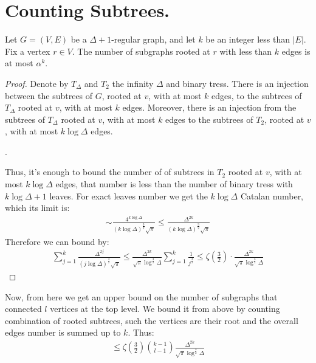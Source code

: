 
   \section{Counting Subtrees.} 

  \begin{claim}
    \label{claim:counting_trees}
    Let $G = \left( V, E \right)$ be a $\Delta + 1$-regular graph, and let $k$ be an integer less than $|E|$. Fix a vertex $r \in V$. The number of subgraphs rooted at $r$ with less than $k$ edges is at most $\alpha^{k}$.
  \end{claim}


  \begin{proof}
    Denote by $T_{\Delta}$ and $T_{2}$ the infinity $\Delta$ and binary tress. There is an injection between the subtrees of $G$, rooted at $v$, with at most $k$ edges, to the subtrees of $T_{\Delta}$ rooted at $v$, with at most $k$ edges. Moreover, there is an injection from the subtrees of $T_{\Delta}$ rooted at $v$, with at most $k$ edges to the subtrees of $T_{2}$, rooted at $v$, with at most $k \log \Delta$ edges. 

    . 

    Thus, it's enough to bound the number of of subtrees in $T_{2}$ rooted at $v$, with at most $ k \log \Delta $ edges, that number is less than the number of binary tress with $k \log \Delta + 1$ leaves. For exact leaves number we get the $k \log \Delta$ Catalan number, which its limit is:   
    \begin{equation*}
      \begin{split}
          \sim \frac{4^{k \log \Delta}}{\left( k \log \Delta \right)^{\frac{3}{2}} \sqrt{\pi} } \le \frac{\Delta^{2k}}{\left( k \log \Delta \right)^{\frac{3}{2}} \sqrt{\pi} } 
      \end{split}
    \end{equation*}
    Therefore we can bound by:
    \begin{equation*}
      \begin{split}
        \sum_{j=1}^{k} \frac{\Delta^{2j}}{\left( j \log \Delta \right)^{\frac{3}{2}} \sqrt{\pi} }  \le \frac{\Delta^{2k}}{\sqrt{\pi}\log^{\frac{3}{2}} \Delta}\sum_{j=1}^{k} \frac{1}{ j^{\frac{3}{2}} }  \le \zeta (\frac{3}{2}) \cdot \frac{\Delta^{2k}}{\sqrt{\pi}\log^{\frac{3}{2}} \Delta}
      \end{split}
    \end{equation*}

  \end{proof}
  Now, from here we get an upper bound on the number of subgraphs that connected $l$ vertices at the top level. We bound it from above by counting combination of rooted subtrees, such the vertices are their root and the overall edges number is summed up to $k$. Thus: 
  \begin{equation*}
    \begin{split}
      \le \zeta (\frac{3}{2}) { k - 1 \choose l - 1 } \frac{\Delta^{2k}}{\sqrt{\pi}\log^{\frac{3}{2}} \Delta}
    \end{split}
  \end{equation*}

